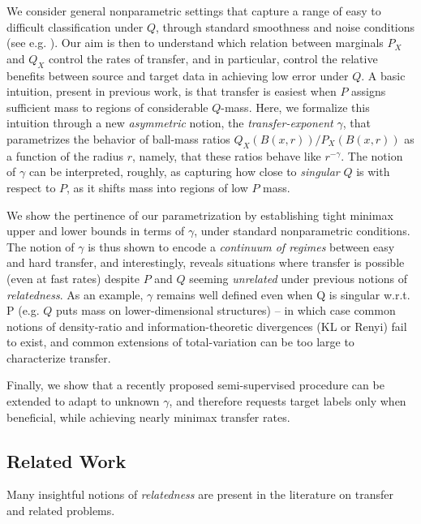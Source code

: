 \documentclass[final,12pt]{colt2018} %
\begin{document}
We consider general nonparametric settings that capture a range of easy to difficult classification under $Q$, through standard smoothness and noise conditions (see e.g. \cite{audibert2007fast}). Our aim is then to understand which relation between marginals $P_X$ and $Q_X$ control the rates of transfer, and in particular, control the relative benefits between source and target data in achieving low error under $Q$. 
A basic intuition, present in previous work, is that transfer is easiest when $P$ assigns sufficient mass to regions of considerable $Q$-mass. Here, we formalize this intuition through a new \emph{asymmetric} notion, the \emph{transfer-exponent} $\gamma$, that parametrizes the behavior of ball-mass ratios $Q_X(B(x,r))/ P_X(B(x,r))$ as a function of the radius $r$, namely, that these ratios behave like $r^{-\gamma}$. The notion of $\gamma$ can be interpreted, roughly, as capturing how close to \emph{singular} $Q$ is with respect to $P$, as it shifts mass into regions of low $P$ mass. 

We show the pertinence of our parametrization by establishing tight minimax upper and lower bounds in terms of $\gamma$, under standard nonparametric conditions. The notion of $\gamma$ is thus shown to encode a \emph{continuum of regimes} between easy and hard transfer, 
and interestingly, reveals situations where transfer is possible (even at fast rates) despite $P$ and $Q$ seeming \emph{unrelated} under previous notions of \emph{relatedness}. As an example, $\gamma$ remains well defined even when Q is singular w.r.t. P (e.g. $Q$ puts mass on lower-dimensional structures) – in which case common notions of density-ratio and information-theoretic divergences (KL or Renyi) fail to exist, and common extensions of total-variation can be too large to characterize transfer. 

Finally, we show that a recently proposed semi-supervised procedure can be extended to adapt to unknown $\gamma$, and therefore requests target labels only when beneficial, while achieving nearly minimax transfer rates. 

\subsection*{Related Work}
Many insightful notions of \emph{relatedness} are present in the literature on transfer and related problems. 
\end{document}
